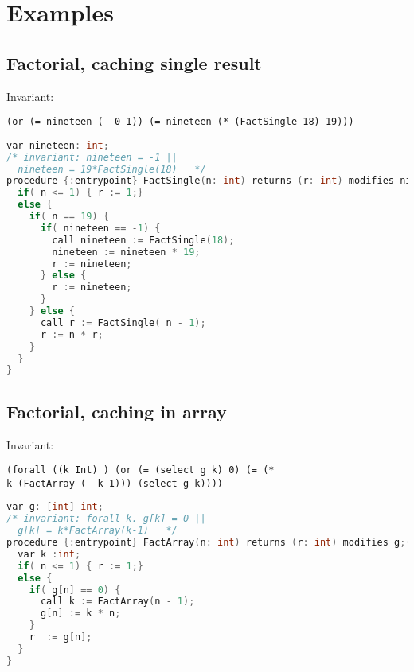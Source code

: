 \section{Examples}

\subsection{Factorial, caching single result}
Invariant:
\begin{verbatim}
(or (= nineteen (- 0 1)) (= nineteen (* (FactSingle 18) 19)))
\end{verbatim}

\begin{lstlisting}[language=c, caption= {Returns factorial of `n',
      and memoizes result for argument value
      `19' in global variable `nineteen'.}, label=lst:fact19]
var nineteen: int;
/* invariant: nineteen = -1 ||
  nineteen = 19*FactSingle(18)   */
procedure {:entrypoint} FactSingle(n: int) returns (r: int) modifies nineteen;{
  if( n <= 1) { r := 1;}
  else {
    if( n == 19) {
      if( nineteen == -1) {
        call nineteen := FactSingle(18);
        nineteen := nineteen * 19;
        r := nineteen;
      } else {
        r := nineteen;
      }
    } else {
      call r := FactSingle( n - 1);
      r := n * r;
    }
  }
}
\end{lstlisting}

\subsection{Factorial, caching in  array}
Invariant:
\begin{verbatim}
(forall ((k Int) ) (or (= (select g k) 0) (= (*
k (FactArray (- k 1))) (select g k))))
\end{verbatim}
\begin{lstlisting}[language=c, caption= {Returns factorial of `n', 
      and caches results for all argument values greater than 1 in global
    array `g'},
    label=lst:factArrayImpl]
var g: [int] int;
/* invariant: forall k. g[k] = 0 ||
  g[k] = k*FactArray(k-1)   */  
procedure {:entrypoint} FactArray(n: int) returns (r: int) modifies g;{
  var k :int;
  if( n <= 1) { r := 1;}
  else {
    if( g[n] == 0) {
      call k := FactArray(n - 1);
      g[n] := k * n;
    } 
    r  := g[n];
  }
}
\end{lstlisting}

